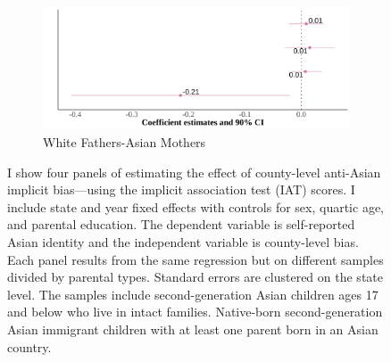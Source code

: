 \begin{center}
\begin{figure}[!htb]
\begin{subfigure}{.48\textwidth}
\caption{White Fathers-Asian Mothers}
\centering
\includegraphics[width=.9\linewidth]{county-by-parents-regs-wh.png}
\end{subfigure}
\caption*{\footnotesize{I show four panels of estimating the effect of county-level anti-Asian implicit bias---using the implicit association test (IAT) scores. I include state and year fixed effects with controls for sex, quartic age, and parental education. The dependent variable is self-reported Asian identity and the independent variable is county-level bias. Each panel results from the same regression but on different samples divided by parental types. Standard errors are clustered on the state level. The samples include second-generation Asian children ages 17 and below who live in intact families. Native-born second-generation Asian immigrant children with at least one parent born in an Asian country.}}
\end{figure}
\end{center}

\pagebreak
\newpage

